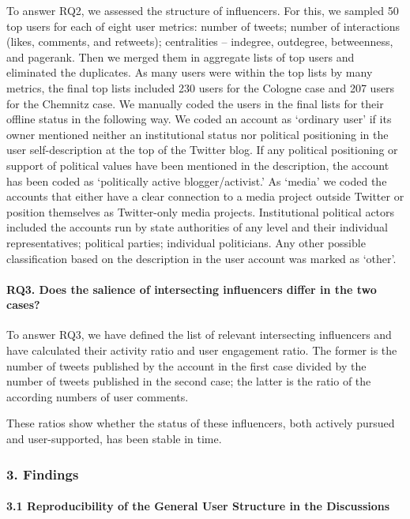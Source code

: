 To answer RQ2, we assessed the structure of influencers. For this, we sampled 50 top users for each of eight user metrics: number of tweets; number of interactions (likes, comments, and retweets); centralities -- indegree, outdegree, betweenness, and pagerank. Then we merged them in aggregate lists of top users and eliminated the duplicates. As many users were within the top lists by many metrics, the final top lists included 230 users for the Cologne case and 207 users for the Chemnitz case. We manually coded the users in the final lists for their offline status in the following way. We coded an account as ‘ordinary user’ if its owner mentioned neither an institutional status nor political positioning in the user self-description at the top of the Twitter blog. If any political positioning or support of political values have been mentioned in the description, the account has been coded as ‘politically active blogger/activist.’ As ‘media’ we coded the accounts that either have a clear connection to a media project outside Twitter or position themselves as Twitter-only media projects. Institutional political actors included the accounts run by state authorities of any level and their individual representatives; political parties; individual politicians. Any other possible classification based on the description in the user account was marked as ‘other’.

\paragraph{RQ3. Does the salience of intersecting influencers differ in the two cases?}

To answer RQ3, we have defined the list of relevant intersecting influencers and have calculated their activity ratio and user engagement ratio. The former is the number of tweets published by the account in the first case divided by the number of tweets published in the second case; the latter is the ratio of the according numbers of user comments.

These ratios show whether the status of these influencers, both actively pursued and user-supported, has been stable in time.

\subsubsection{3. Findings}

\paragraph{3.1 Reproducibility of the General User Structure in the Discussions}

